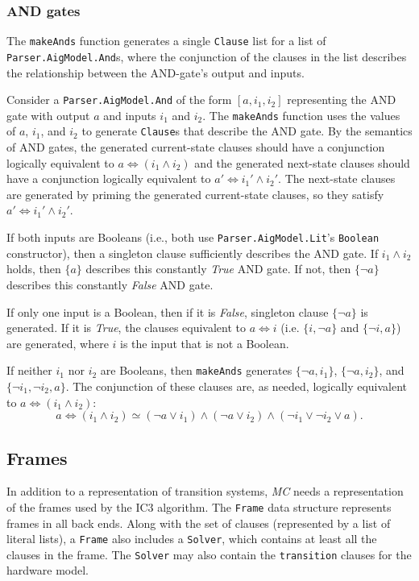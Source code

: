 \documentclass[12pt,a4paper,twoside,openright]{report}
\begin{document}
{{\subsubsection{AND gates}
The \verb,makeAnds, function generates a single \verb,Clause, list for a list of \verb,Parser.AigModel.And,s,
where the conjunction of the clauses in the list describes the relationship between the AND-gate's output
and inputs.

Consider a \verb,Parser.AigModel.And, of the form $[a, i_1, i_2]$ representing the AND gate
with output $a$ and inputs $i_1$ and $i_2$.
The \verb,makeAnds, function uses the values of $a$, $i_1$, and $i_2$ to generate
\verb,Clause,s that describe the AND gate.
By the semantics of AND gates, the generated current-state clauses should have a conjunction
logically equivalent to $a \Leftrightarrow (i_1 \wedge i_2)$ and the generated next-state
clauses should have a conjunction logically equivalent to
$a' \Leftrightarrow i_1' \wedge i_2'$. The next-state clauses are generated
by priming the generated current-state clauses, so they satisfy
$a' \Leftrightarrow i_1' \wedge i_2'$.

If both inputs are Booleans (i.e., both use \verb,Parser.AigModel.Lit,'s \verb,Boolean,
constructor), then a singleton clause sufficiently describes the AND gate.
If $i_1 \wedge i_2$ holds, then $\{a\}$ describes this constantly {\it True} AND gate.
If not, then $\{\neg a\}$ describes this constantly {\it False} AND gate.

If only one input is a Boolean, then if it is {\it False},
singleton clause $\{\neg a\}$ is generated. If it is {\it True},
the clauses equivalent to $a \Leftrightarrow i$ (i.e.
$\{i, \neg a\}$ and $\{\neg i, a\}$)
are generated, where $i$ is the input that is not a Boolean.

If neither $i_1$ nor $i_2$ are Booleans, then \verb,makeAnds, generates
$\{\neg a, i_1\}$, $\{\neg a, i_2\}$, and
$\{\neg i_1,\neg i_2, a\}$. The conjunction of these clauses are, as needed,
logically equivalent to $a \Leftrightarrow (i_1 \wedge i_2)$:
$$a \Leftrightarrow (i_1 \wedge i_2) \simeq
(\neg a \vee i_1) \wedge (\neg a \vee i_2) \wedge (\neg i_1 \vee \neg i_2 \vee a).$$

\subsection{Frames}
In addition to a representation of transition systems, \emph{MC} needs a representation
of the frames used by the IC3 algorithm.
The \verb,Frame, data structure represents frames in all back ends.
Along with the set of clauses (represented by a list of literal lists), a \verb,Frame, also
includes a \verb,Solver,, which contains at least all the clauses in the frame.
The \verb,Solver, may also contain the \verb,transition, clauses for the hardware model.

}}
\end{document}
